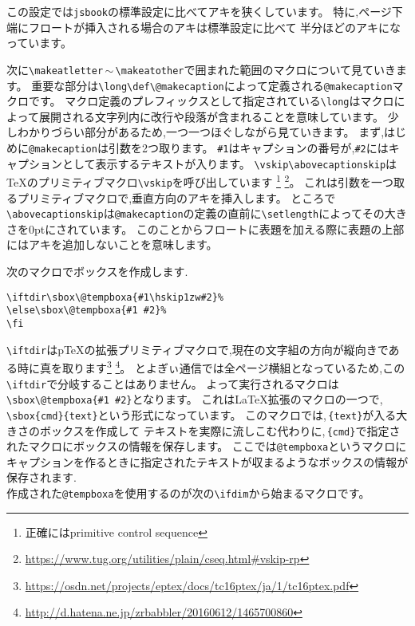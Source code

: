 この設定では\texttt{jsbook}の標準設定に比べてアキを狭くしています。
特に,ページ下端にフロートが挿入される場合のアキは標準設定に比べて
半分ほどのアキになっています。

次に\verb|\makeatletter|\,$\sim$\,\verb|\makeatother|で囲まれた範囲のマクロについて見ていきます。
重要な部分は\verb|\long\def\@makecaption|によって定義される\verb|@makecaption|マクロです。
マクロ定義のプレフィックスとして指定されている\verb|\long|はマクロによって展開される文字列内に改行や段落が含まれることを意味しています。
少しわかりづらい部分があるため,一つ一つほぐしながら見ていきます。
まず,はじめに\verb|@makecaption|は引数を2つ取ります。
\verb|#1|はキャプションの番号が,\verb|#2|にはキャプションとして表示するテキストが入ります。
\verb|\vskip\abovecaptionskip|は{\TeX}のプリミティブマクロ\verb|\vskip|を呼び出しています
\footnote{正確にはprimitive control sequence}
\footnote{\url{https://www.tug.org/utilities/plain/cseq.html#vskip-rp}}。
これは引数を一つ取るプリミティブマクロで,垂直方向のアキを挿入します。
ところで\verb|\abovecaptionskip|は\verb|@makecaption|の定義の直前に\verb|\setlength|によってその大きさを0ptにされています。
このことからフロートに表題を加える際に表題の上部にはアキを追加しないことを意味します。

次のマクロでボックスを作成します.
\begin{verbatim}
\iftdir\sbox\@tempboxa{#1\hskip1zw#2}%
\else\sbox\@tempboxa{#1 #2}%
\fi
\end{verbatim}%
\verb|\iftdir|は{p\TeX}の拡張プリミティブマクロで,現在の文字組の方向が縦向きである時に真を取ります\footnote{\url{https://osdn.net/projects/eptex/docs/tc16ptex/ja/1/tc16ptex.pdf}}
\footnote{\url{http://d.hatena.ne.jp/zrbabbler/20160612/1465700860}}。
とよぎぃ通信では全ページ横組となっているため,この\verb|\iftdir|で分岐することはありません。
よって実行されるマクロは\verb|\sbox\@tempboxa{#1 #2}|となります。
これは{\LaTeX}拡張のマクロの一つで,\,\verb|\sbox{cmd}{text}|という形式になっています。
このマクロでは,\,\verb|{text}|が入る大きさのボックスを作成して
テキストを実際に流しこむ代わりに,\,\verb|{cmd}|で指定されたマクロにボックスの情報を保存します。
ここでは\verb|@tempboxa|というマクロにキャプションを作るときに指定されたテキストが収まるようなボックスの情報が保存されます.\\
作成された\verb|@tempboxa|を使用するのが次の\verb|\ifdim|から始まるマクロです。

